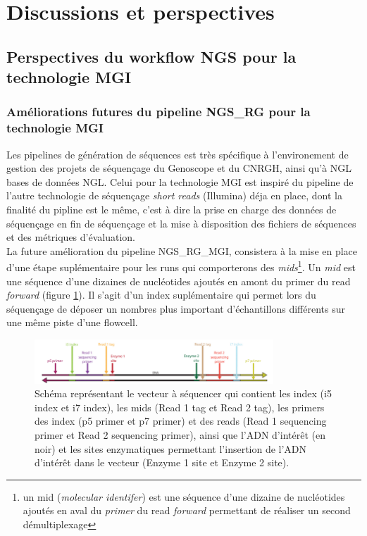 \section{Discussions et perspectives}
\subsection{Perspectives du workflow NGS pour la technologie MGI}

\subsubsection{Améliorations futures du pipeline NGS\_RG pour la technologie MGI}
Les pipelines de génération de séquences est très spécifique à l'environement de gestion des projets de séquençage du Genoscope et du CNRGH, ainsi qu'à NGL bases de données NGL. Celui pour la technologie MGI est inspiré du pipeline de l'autre technologie de séquençage \emph{short reads} (Illumina) déja en place, dont la finalité du pipline est le même, c'est à dire la prise en charge des données de séquençage en fin de séquençage et la mise à disposition des fichiers de séquences et des métriques d'évaluation.\\

La future amélioration du pipeline NGS\_RG\_MGI, consistera à la mise en place d'une étape suplémentaire pour les runs qui comporterons des \emph{mids}\footnote{un mid (\emph{molecular identifer}) est une séquence d'une dizaine de nucléotides ajoutés en aval du \emph{primer} du read \emph{forward} permettant de réaliser un second démultiplexage}. 
Un \emph{mid} est une séquence d'une dizaines de nucléotides ajoutés en amont du primer du read \emph{forward} (figure \ref{schema-mid}). Il s'agit d'un index suplémentaire qui permet lors du séquençage de déposer un nombres plus important d'échantillons différents sur une même piste d'une flowcell. 

\begin{figure}[H]
    \centering
    \includegraphics[width=0.8\textwidth]{img/schema-reads-index-mids.png}
    \caption{\footnotesize{Schéma représentant le vecteur à séquencer qui contient les index (i5 index et i7 index), les mids (Read 1 tag et Read 2 tag), les primers des index (p5 primer et p7 primer) et des reads (Read 1 sequencing primer et Read 2 sequencing primer), ainsi que l'ADN d'intérêt (en noir) et les sites enzymatiques permettant l'insertion de l'ADN d'intérêt dans le vecteur (Enzyme 1 site et Enzyme 2 site).}}
    \label{schema-mid}
\end{figure}

